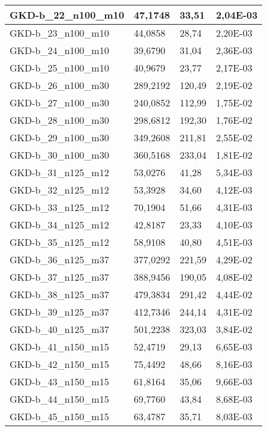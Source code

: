 \begin{table}[!ht]
\begin{adjustbox}{height=12cm}
\begin{tabular}{|l|l|l|l|}
        GKD-b\_22\_n100\_m10 & 47,1748  & 33,51  & 2,04E-03 \\ \hline
        GKD-b\_23\_n100\_m10 & 44,0858  & 28,74  & 2,20E-03 \\ \hline
        GKD-b\_24\_n100\_m10 & 39,6790  & 31,04  & 2,36E-03 \\ \hline
        GKD-b\_25\_n100\_m10 & 40,9679  & 23,77  & 2,17E-03 \\ \hline
        GKD-b\_26\_n100\_m30 & 289,2192 & 120,49 & 2,19E-02 \\ \hline
        GKD-b\_27\_n100\_m30 & 240,0852 & 112,99 & 1,75E-02 \\ \hline
        GKD-b\_28\_n100\_m30 & 298,6812 & 192,30 & 1,76E-02 \\ \hline
        GKD-b\_29\_n100\_m30 & 349,2608 & 211,81 & 2,55E-02 \\ \hline
        GKD-b\_30\_n100\_m30 & 360,5168 & 233,04 & 1,81E-02 \\ \hline
        GKD-b\_31\_n125\_m12 & 53,0276  & 41,28  & 5,34E-03 \\ \hline
        GKD-b\_32\_n125\_m12 & 53,3928  & 34,60  & 4,12E-03 \\ \hline
        GKD-b\_33\_n125\_m12 & 70,1904  & 51,66  & 4,31E-03 \\ \hline
        GKD-b\_34\_n125\_m12 & 42,8187  & 23,33  & 4,10E-03 \\ \hline
        GKD-b\_35\_n125\_m12 & 58,9108  & 40,80  & 4,51E-03 \\ \hline
        GKD-b\_36\_n125\_m37 & 377,0292 & 221,59 & 4,29E-02 \\ \hline
        GKD-b\_37\_n125\_m37 & 388,9456 & 190,05 & 4,08E-02 \\ \hline
        GKD-b\_38\_n125\_m37 & 479,3834 & 291,42 & 4,44E-02 \\ \hline
        GKD-b\_39\_n125\_m37 & 412,7346 & 244,14 & 4,31E-02 \\ \hline
        GKD-b\_40\_n125\_m37 & 501,2238 & 323,03 & 3,84E-02 \\ \hline
        GKD-b\_41\_n150\_m15 & 52,4719  & 29,13  & 6,65E-03 \\ \hline
        GKD-b\_42\_n150\_m15 & 75,4492  & 48,66  & 8,16E-03 \\ \hline
        GKD-b\_43\_n150\_m15 & 61,8164  & 35,06  & 9,66E-03 \\ \hline
        GKD-b\_44\_n150\_m15 & 69,7760  & 43,84  & 8,68E-03 \\ \hline
        GKD-b\_45\_n150\_m15 & 63,4787  & 35,71  & 8,03E-03 \\ \hline

\end{tabular}
\end{adjustbox}
\end{table}
